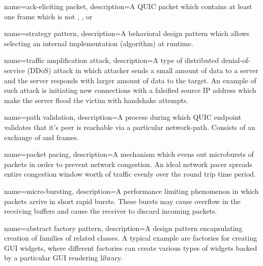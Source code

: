 {
  name=ack-eliciting packet,
  description={A QUIC packet which contains at least one frame which is not \PADDING{},  \ACK{}, or \CONNECTIONCLOSE{}}
}

{
  name=strategy pattern,
  description={A behavioral design pattern which allows selecting an internal implementation (algorithm) at runtime.}
}

{
  name=traffic amplification attack,
  description={A type of distributed denial-of-service (DDoS) attack in which attacker sends a small amount of data to a server and the server responds with larger amount of data to the target. An example of such attack is initiating new connections with a falsified source IP address which make the server flood the victim with handshake attempts.}
}

{
  name=path validation,
  description={A process during which QUIC endpoint validates that it's peer is reachable via a particular \gls{network-path}. Consists of an exchange of \PATHCHALLENGE{} and \PATHRESPONSE{} frames.}
}

{
  name=packet pacing,
  description={A mechanism which evens out microbursts of packets in order to prevent network congestion. An ideal network pacer spreads entire congestion window worth of traffic evenly over the round trip time period.}
}

{
  name=micro-bursting,
  description={A performance limiting phenomenon in which packets arrive in short rapid bursts. These bursts may cause overflow in the receiving buffers and cause the receiver to discard incoming packets.}
}

{
  name=abstract factory pattern,
  description={A design pattern encapsulating creation of families of related classes. A typical example are factories for creating GUI widgets, where different factories can create various types of widgets backed by a particular GUI rendering library.}
}



